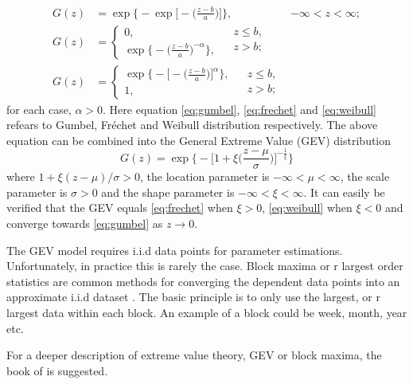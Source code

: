 \begin{align}
G(z) &=\exp\Big\{-\exp\Big[-\Big( \frac{z-b}{a}\Big) \Big]\Big\},  & -\infty < z < \infty;\label{eq:gumbel}\\
G(z) &=
  \begin{cases}
    0,\\
    \exp\big\{-\big(\frac{z-b}{a} \big)^{-\alpha} \big\},  
  \end{cases}
 \begin{split}
   &z\leq b, \\
   &z >b;\label{eq:frechet}\\
  \end{split}\\
G(z) &=
  \begin{cases}
    \exp\Big\{-\Big[-\Big( \frac{z-b}{a}\Big) \Big]^{\alpha}\Big\}, \\
    1,  
  \end{cases}  
 \begin{split}
   &z \leq b,\\
   &z>b;\label{eq:weibull}
  \end{split}
\end{align}
for each case, $\alpha>0$. Here equation \eqref{eq:gumbel}, \eqref{eq:frechet} and \eqref{eq:weibull} refears to Gumbel, Fr{\'e}chet and Weibull distribution respectively. The above equation can be combined into the General Extreme Value (GEV) distribution
\begin{equation}
G(z)=\exp\Bigg\{-\Big[1+\xi \Big(\frac{z-\mu}{\sigma} \Big) \Big]^{-\frac{1}{\xi}} \Bigg\}
\end{equation}
where $1+\xi(z-\mu)/\sigma>0$, the location parameter is $-\infty<\mu<\infty$, the scale parameter is $\sigma>0$ and the shape parameter is $-\infty<\xi<\infty$. It can easily be verified that the GEV equals \eqref{eq:frechet} when $\xi>0$, \eqref{eq:weibull} when $\xi<0$ and converge towards \eqref{eq:gumbel} as $z \to 0$.

The GEV model requires i.i.d data points for parameter estimations. Unfortunately, in practice this is rarely the case. Block maxima or r largest order statistics are common methods for converging the dependent data points into an approximate i.i.d dataset \cite[Chapter~3]{stuart}. The basic principle is to only use the largest, or r largest data within each block. An example of a block could be week, month, year etc.

For a deeper description of extreme value theory, GEV or block maxima, the book of \cite{stuart} is suggested.

